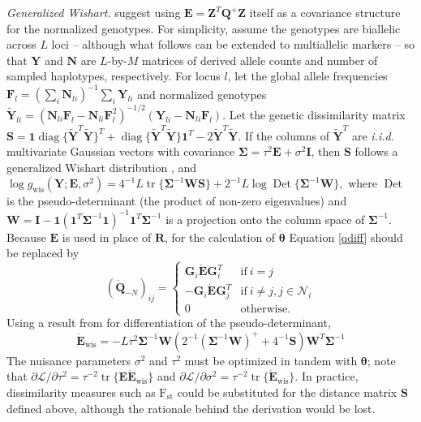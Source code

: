 \documentclass[11pt]{article}
\DeclareMathOperator*{\diag}{diag}
\DeclareMathOperator*{\Det}{Det}
\DeclareMathOperator*{\trace}{tr}
\newcommand{\mat}[1]{\mathbf{#1}}
\begin{document}
\emph{Generalized Wishart.} \cite{peterson2019} suggest using $\mat E = \mat Z^T \mat Q^+ \mat Z$ itself
as a covariance structure for the normalized genotypes. For simplicity, assume the
genotypes are biallelic across $L$ loci -- although what follows can be
extended to multiallelic markers -- so that $\mat Y$ and $\mat N$ are $L$-by-$M$
matrices of derived allele counts and number of sampled haplotypes,
respectively. For locus $l$, let the global allele frequencies $\mat F_l = (\sum_i \mat
N_{li})^{-1} \sum_i \mat Y_{li} $ and normalized genotypes $\tilde{\mat Y}_{li}
= (\mat N_{li} \mat F_l - \mat N_{li} \mat F_l^2)^{-1/2} (\mat Y_{li} - \mat
N_{li} \mat F_l)$.  Let the genetic dissimilarity matrix $\mat S = \mat 1 \diag
\{ \tilde{\mat Y}^T \tilde{\mat Y} \}^T + \diag \{ \tilde{\mat Y}^T \tilde{\mat
  Y} \} \mat 1^T - 2 \tilde{\mat Y}^T \tilde{\mat Y}$. If the columns of
$\tilde{\mat Y}^T$ are \emph{i.i.d.} multivariate Gaussian vectors with
covariance $\bm \Sigma = \tau^2 \mat E + \sigma^2 \mat I$, then $\mat S$
follows a generalized Wishart distribution \cite{mccullaugh}, and $\log
g_{\mathrm{wis}} (\mat Y; \mat E, \sigma^2) = 4^{-1} L \trace \{ \bm
\Sigma^{-1} \mat W \mat S \} + 2^{-1} L \log \Det \{ \mat \Sigma^{-1} \mat W
\},$ where $\Det$ is the pseudo-determinant (the product of non-zero
eigenvalues) and $\mat W = \mat I - \mat 1 (\mat 1^T \mat \Sigma^{-1} \mat 1)^{-1}
\mat 1^T \bm \Sigma^{-1}$ is a projection onto the column space of $\bm \Sigma^{-1}$.  Because $\mat E$ is used in place of $\mat R$, for the
calculation of $\dot{\bm \theta}$ Equation \ref{qdiff} should be replaced by
\begin{equation}
  \label{rdiff2}
  (\dot{\mat Q}_{-N})_{ij} = \begin{cases} 
    \mat G_i \dot{\mat E} \mat G_i^T & \mathrm{if~} i = j \\
    -\mat G_i \dot{\mat E} \mat G_j^T & \mathrm{if~} i \neq j, j \in \mathcal{N}_i \\
    0 & \mathrm{otherwise.}
  \end{cases}
\end{equation}
Using a result from \cite{holbrook2018} for differentiation of the pseudo-determinant,
\[
  \dot{\mat E}_{\mathrm{wis}} = - L \tau^2 \bm \Sigma^{-1} \mat W  (2^{-1}(\bm \Sigma^{-1} \mat W)^+ + 4^{-1} \mat S) \mat W^T \bm \Sigma^{-1}
\]
The nuisance parameters $\sigma^2$ and $\tau^2$ must be optimized in tandem with $\bm \theta$; note that
$\partial \mathcal{L} / \partial \tau^2 = \tau^{-2} \trace \{ \mat E \dot{\mat E}_{\mathrm{wis}} \}$ and
$\partial \mathcal{L} / \partial \sigma^2 = \tau^{-2} \trace \{ \dot{\mat
  E}_{\mathrm{wis}} \}$. In practice, dissimilarity measures such as
$\mathrm{F}_{\mathrm{st}}$ could be substituted for the distance matrix $\mat S$ defined above,
although the rationale behind the derivation would be lost.
\end{document}
